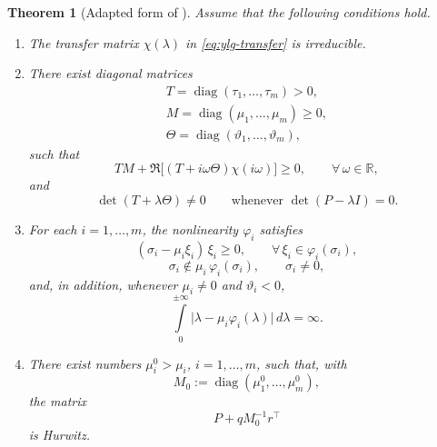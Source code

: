 \documentclass[journal]{IEEEtran}
\newtheorem{theorem}{Theorem}
\DeclareMathOperator{\diag}{diag}
\begin{document}
\begin{theorem}[Adapted form of {\cite[Theorem~3.1]{YLG}}]
\label{thm:YLG-adapted-faithful}
Assume that the following conditions hold.

\begin{enumerate}
\item[(i)]
The transfer matrix \(\chi(\lambda)\) in \eqref{eq:ylg-transfer} is
irreducible.

\item[(ii)]
There exist diagonal matrices
\begin{multline*}
  T=\diag(\tau_1,\dots,\tau_m)>0,\\
  M=\diag(\mu_1,\dots,\mu_m)\ge 0,\\
  \Theta=\diag(\vartheta_1,\dots,\vartheta_m),
\end{multline*}   
such that
\begin{equation}
  TM + \Re\!\bigl[(T+i\omega \Theta)\chi(i\omega)\bigr] \ge 0,
  \qquad \forall\,\omega\in\mathbb{R},
  \label{eq:ylg-freq-ineq}
\end{equation}
and
\begin{equation}
  \det(T+\lambda \Theta)\neq 0
  \qquad
  \text{whenever } \det(P-\lambda I)=0.
  \label{eq:ylg-det-cond}
\end{equation}

\item[(iii)]
For each \(i=1,\dots,m\), the nonlinearity \(\varphi_i\) satisfies
\begin{equation}
  (\sigma_i-\mu_i\xi_i)\,\xi_i \ge 0,
  \qquad
  \forall\,\xi_i\in\varphi_i(\sigma_i),
  \label{eq:ylg-sector}
\end{equation}
\begin{equation}
  \sigma_i \notin \mu_i\,\varphi_i(\sigma_i),
  \qquad
  \sigma_i\neq 0,
  \label{eq:ylg-nondeg}
\end{equation}
and, in addition, whenever \(\mu_i\neq 0\) and \(\vartheta_i<0\),
\begin{equation}
  \int\limits_{0}^{\pm\infty}
  \bigl|\lambda-\mu_i\varphi_i(\lambda)\bigr|\,d\lambda
  =\infty.
  \label{eq:ylg-integral}
\end{equation}

\item[(iv)]
There exist numbers \(\mu_i^0>\mu_i\), \(i=1,\dots,m\), such that, with
\[
  M_0:=\diag(\mu_1^0,\dots,\mu_m^0),
\]
the matrix
\begin{equation}
  P + q M_0^{-1} r^{\top}
  \label{eq:ylg-hurwitz}
\end{equation}
is Hurwitz.


\end{enumerate}
\end{theorem}
\end{document}
